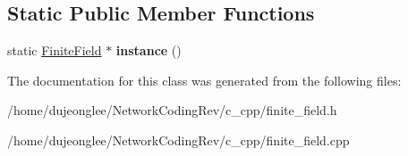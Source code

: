 \subsection*{Static Public Member Functions}
\begin{DoxyCompactItemize}
\item 
static \hyperlink{class_network_coding_1_1_finite_field}{Finite\+Field} $\ast$ {\bfseries instance} ()\hypertarget{class_network_coding_1_1_finite_field_a427c30d3fd41550434292c36ce88a8dc}{}\label{class_network_coding_1_1_finite_field_a427c30d3fd41550434292c36ce88a8dc}

\end{DoxyCompactItemize}


The documentation for this class was generated from the following files\+:\begin{DoxyCompactItemize}
\item 
/home/dujeonglee/\+Network\+Coding\+Rev/c\+\_\+cpp/finite\+\_\+field.\+h\item 
/home/dujeonglee/\+Network\+Coding\+Rev/c\+\_\+cpp/finite\+\_\+field.\+cpp\end{DoxyCompactItemize}
